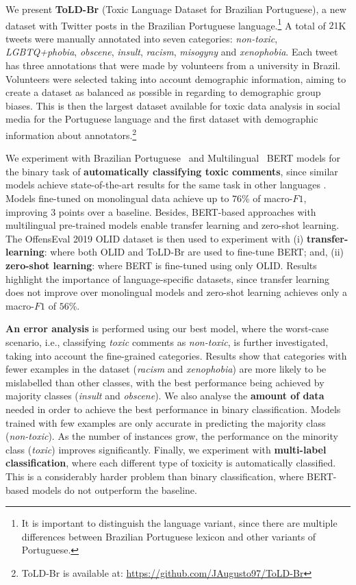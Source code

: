 \documentclass[11pt,a4paper]{article}
\begin{document}
We present \textbf{ToLD-Br} (Toxic Language Dataset for Brazilian Portuguese), a new dataset with Twitter posts in the Brazilian Portuguese language.\footnote{It is important to distinguish the language variant, since there are multiple differences between Brazilian Portuguese lexicon and other variants of Portuguese.} A total of $21$K tweets were manually annotated into seven categories: \textit{non-toxic}, \textit{LGBTQ+phobia}, \textit{obscene}, \textit{insult}, \textit{racism}, \textit{misogyny} and \textit{xenophobia}. Each tweet has three annotations that were made by volunteers from a university in Brazil. Volunteers were selected taking into account demographic information, aiming to create a dataset as balanced as possible in regarding to demographic group biases.  
This is then the largest dataset available for toxic data analysis in social media for the Portuguese language and the first dataset with demographic information about annotators.\footnote{ToLD-Br is available at: \url{https://github.com/JAugusto97/ToLD-Br}}

We experiment with Brazilian Portuguese~\cite{souza2019portuguese} and Multilingual~\cite{Wolf2019HuggingFacesTS} BERT models \cite{devlin-etal-2019-bert} for the binary task of \textbf{automatically classifying toxic comments}, since similar models achieve state-of-the-art results for the same task in other languages \cite{zampieri-etal-2019-semeval}. Models fine-tuned on monolingual data achieve up to $76$\% of macro-$F1$, improving $3$ points over a baseline. 
Besides, BERT-based approaches with multilingual pre-trained models enable transfer learning and zero-shot learning. The OffensEval 2019 OLID dataset \cite{zampieri-etal-2019-predicting} is then used to experiment with (i) \textbf{transfer-learning}: where both OLID and ToLD-Br are used to fine-tune BERT; and, (ii) \textbf{zero-shot learning}: where BERT is fine-tuned using only OLID. Results highlight the importance of language-specific datasets, since transfer learning does not improve over monolingual models and zero-shot learning achieves only a macro-$F1$ of $56$\%. 

\textbf{An error analysis} is performed using our best model, where the worst-case scenario, i.e., classifying \textit{toxic} comments as \textit{non-toxic}, is further investigated, taking into account the fine-grained categories. Results show that categories with fewer examples in the dataset (\textit{racism} and \textit{xenophobia}) are more likely to be mislabelled than other classes, with the best performance being achieved by majority classes (\textit{insult} and \textit{obscene}). 
We also analyse the \textbf{amount of data} needed in order to achieve the best performance in binary classification. Models trained with few examples are only accurate in predicting the majority class (\textit{non-toxic}). As the number of instances grow, the performance on the minority class (\textit{toxic}) improves significantly.  
Finally, we experiment with \textbf{multi-label classification}, where each different type of toxicity is automatically classified. This is a considerably harder problem than binary classification, where BERT-based models do not outperform the baseline.
\end{document}
